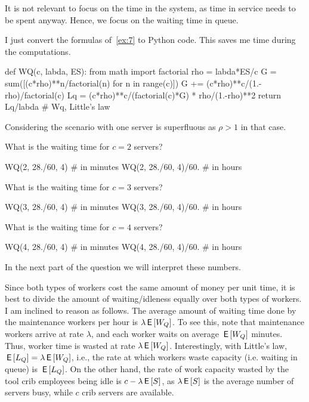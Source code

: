 \begin{exercise}[Hall 5.10]
\begin{solution}
It is not relevant to focus on the time in the system, as time
 in service needs to be spent anyway. Hence, we focus on the waiting
 time in queue.


I just convert the formulas of~\cref{ex:7} to Python code. This saves
me time during the computations.

\begin{pyconsole}
 
def WQ(c, labda, ES):
 from math import factorial
 rho = labda*ES/c
 G = sum([(c*rho)**n/factorial(n) for n in range(c)])
 G += (c*rho)**c/(1.-rho)/factorial(c)
 Lq = (c*rho)**c/(factorial(c)*G) * rho/(1.-rho)**2
 return Lq/labda # Wq, Little's law

\end{pyconsole} 

Considering the scenario with one server is superfluous as $\rho>1$ in
that case.

What is the waiting time for $c=2$ servers?

\begin{pyconsole}
WQ(2, 28./60, 4) # in minutes
WQ(2, 28./60, 4)/60. # in hours
\end{pyconsole}

What is the waiting time for $c=3$ servers?

\begin{pyconsole}
WQ(3, 28./60, 4) # in minutes
WQ(3, 28./60, 4)/60. # in hours
\end{pyconsole}


What is the waiting time for $c=4$ servers?

\begin{pyconsole}
WQ(4, 28./60, 4) # in minutes
WQ(4, 28./60, 4)/60. # in hours
\end{pyconsole} 

In the next part of the question we will interpret these numbers.

Since both types of workers cost the same amount of money per unit
time, it is best to divide the amount of waiting/idleness equally over
both types of workers. I am inclined to reason as follows. The
average amount of waiting time done by the maintenance workers per
hour is $\lambda \,\mathsf{E}\left[W_Q\right]$. To see this, note that maintenance workers arrive at rate $\lambda$, and each worker waits on average $\,\mathsf{E}\left[W_Q\right]$ minutes. Thus, worker time is wasted at rate $\lambda \,\mathsf{E}\left[W_Q\right]$. Interestingly, with Little's law, $\,\mathsf{E}\left[L_Q\right]=\lambda \,\mathsf{E}\left[W_Q\right]$, i.e., the rate at which workers waste capacity (i.e. waiting in queue) is $\,\mathsf{E}\left[L_Q\right]$. On the other hand, the rate of work capacity wasted by the tool crib employees being idle is $c-\lambda \,\mathsf{E}\left[S\right]$, as $\lambda \,\mathsf{E}\left[S\right]$ is the average number of servers busy, while $c$ crib servers are available.


\end{solution}
\end{exercise}
